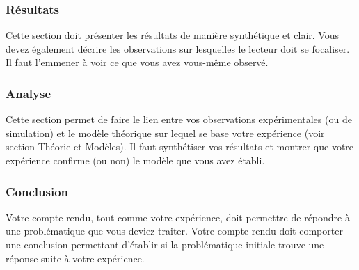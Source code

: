 \documentclass[11pt]{article} %
\begin{document}
\subsubsection{Résultats}

Cette section doit présenter les résultats de manière synthétique et clair. Vous devez également décrire les observations sur lesquelles le lecteur doit se focaliser. Il faut l'emmener à voir ce que vous avez vous-même observé.

\subsubsection{Analyse}

Cette section permet de faire le lien entre vos observations expérimentales (ou de simulation) et le modèle théorique sur lequel se base votre expérience (voir section Théorie et Modèles). Il faut synthétiser vos résultats et montrer que votre expérience confirme (ou non) le modèle que vous avez établi.

\subsubsection{Conclusion}

Votre compte-rendu, tout comme votre expérience, doit permettre de répondre à une problématique que vous deviez traiter. Votre compte-rendu doit comporter une conclusion permettant d'établir si la problématique initiale trouve une réponse suite à votre expérience.
\end{document}
